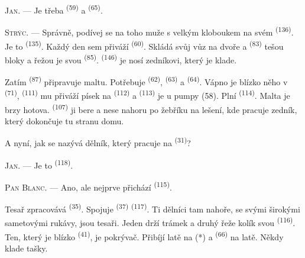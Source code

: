 \textsc{Jan}. --- Je třeba  \textsuperscript{(59)} a 
\textsuperscript{(65)}.

\textsc{Strýc}. --- Správně, podívej se na toho muže s velkým kloboukem na svém
 \textsuperscript{(136)}. Je to  \textsuperscript{(135)}.
Každý den sem přiváží  \textsuperscript{(60)}. Skládá svůj vůz na dvoře
a  \textsuperscript{(83)} tešou bloky a řežou je svou
 \textsuperscript{(85)}. 
\textsuperscript{(146)} je nosí zedníkovi, který je klade.

Zatím  \textsuperscript{(87)} připravuje maltu. Potřebuje 
\textsuperscript{(62)},  \textsuperscript{(63)} a 
\textsuperscript{(64)}. Vápno je blízko něho v  \textsuperscript{(71)},
 \textsuperscript{(111)} mu přiváží písek na
 \textsuperscript{(112)} a  \textsuperscript{(113)} je
u pumpy (58). Plní  \textsuperscript{(114)}. Malta je brzy hotova.
 \textsuperscript{(107)} ji bere a nese nahoru po žebříku na
lešení, kde pracuje zedník, který dokončuje tu stranu domu.

A nyní, jak se nazývá dělník, který pracuje na  \textsuperscript{(31)}?

\textsc{Jan}. --- Je to  \textsuperscript{(118)}.

\VUsaut{3.0mm}
\VUsaut{3.0mm}

\textsc{Pan Blanc}. --- Ano, ale nejprve přichází  \textsuperscript{(115)}.

Tesař zpracovává  \textsuperscript{(35)}. Spojuje 
\textsuperscript{(37)}  \textsuperscript{(117)}. Ti dělníci tam nahoře, se
svými širokými sametovými rukávy, jsou tesaři. Jeden drží trámek a druhý řeže kolík svou
 \textsuperscript{(116)}. Ten, který je blízko 
\textsuperscript{(41)}, je pokrývač. Přibíjí latě na (*)  a
 \textsuperscript{(66)} na latě. Někdy klade tašky.


